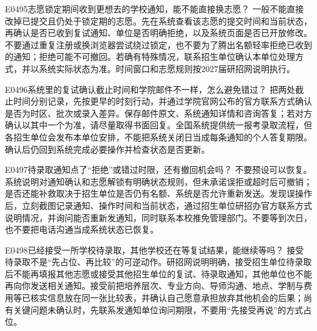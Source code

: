 \begin{qa}{E0495}{志愿锁定期间收到更想去的学校通知，能不能直接换志愿？}
一般不能直接改掉已提交且仍处于锁定期的志愿。先在系统查看该志愿的提交时间和当前状态，再确认是否已收到复试通知、单位是否明确拒绝，以及系统页面是否已开放修改。不要通过重复注册或换浏览器尝试绕过锁定，也不要为了腾出名额轻率拒绝已收到的通知；拒绝可能不可撤回。若确有特殊情况，联系招生单位确认本单位处理方式，并以系统实际状态为准。时间窗口和志愿规则按2027届研招网说明执行。
\end{qa}

\begin{qa}{E0496}{系统里的复试确认截止时间和学院邮件不一样，怎么避免错过？}
把两处截止时间分别记录，先按更早的时刻行动，并通过学院官网公布的官方联系方式确认是否为时区、批次或录入差异。保存邮件原文、系统通知详情和咨询答复；若对方确认以其中一个为准，请尽量取得书面回复。全国系统提供统一报考录取流程，但各招生单位会发布本单位安排，不能把系统关闭日当成每条通知的个人答复期限。确认后仍回到系统完成必要操作并检查状态是否更新。
\end{qa}

\begin{qa}{E0497}{待录取通知点了“拒绝”或错过时限，还有撤回机会吗？}
不要预设可以恢复。系统说明对通知确认和志愿解锁有明确状态规则，但未承诺误拒或超时后可撤销；是否还能补救取决于招生单位是否仍有名额、系统是否允许重新发送。发现误操作后，立刻截图记录通知、操作时间和当前状态，通过招生单位研招办官方联系方式说明情况，并询问能否重新发通知，同时联系本校推免管理部门。不要等到次日，也不要把电话沟通当成系统状态已恢复。
\end{qa}

\begin{qa}{E0498}{已经接受一所学校待录取，其他学校还在等复试结果，能继续等吗？}
接受待录取不是“先占位、再比较”的可逆动作。研招网说明明确，接受招生单位待录取后不能再填报其他志愿或接受其他招生单位的复试、待录取通知，其他单位也不能再向你发送相关通知。接受前把培养层次、专业方向、导师沟通、地点、学制与费用等已核实信息放在同一张比较表，并确认自己愿意承担放弃其他机会的后果；尚有关键问题未确认时，先联系发通知单位询问期限，不要用“先接受再说”的方式占位。
\end{qa}

